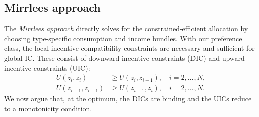 \documentclass[12pt,a4paper]{article}
\theoremstyle{definition}
\theoremstyle{plain}
\theoremstyle{remark}
\begin{document}
\subsection{Mirrlees approach}
\label{sec:mirrlees_approach}

The \emph{Mirrlees approach} directly solves for the constrained-efficient allocation by choosing type-specific consumption and income bundles. With our preference class, the local incentive compatibility constraints are necessary and sufficient for global IC. These consist of downward incentive constraints (DIC) and upward incentive constraints (UIC):
\begin{align}
  U(z_i, z_i) &\geq U(z_i, z_{i-1}), \quad i = 2, \ldots, N, \tag{DIC} \label{eq:DIC} \\
  U(z_{i-1}, z_{i-1}) &\geq U(z_{i-1}, z_i), \quad i = 2, \ldots, N. \tag{UIC} \label{eq:UIC}
\end{align}
We now argue that, at the optimum, the DICs are binding and the UICs reduce to a monotonicity condition.
\end{document}
